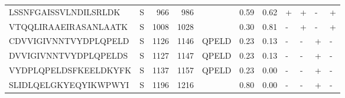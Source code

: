 \begin{tabular}{llrrlrrllll}
LSSNFGAISSVLNDILSRLDK &       S &    966 &   986 &                     &            0.59 &             0.62 &      + &       + &      - &       + \\
VTQQLIRAAEIRASANLAATK &       S &   1008 &  1028 &                     &            0.30 &             0.81 &      - &       + &      - &       + \\
CDVVIGIVNNTVYDPLQPELD &       S &   1126 &  1146 &               QPELD &            0.23 &             0.13 &      - &       - &      + &       - \\
DVVIGIVNNTVYDPLQPELDS &       S &   1127 &  1147 &               QPELD &            0.23 &             0.13 &      - &       - &      + &       - \\
VYDPLQPELDSFKEELDKYFK &       S &   1137 &  1157 &               QPELD &            0.23 &             0.00 &      - &       - &      + &       - \\
SLIDLQELGKYEQYIKWPWYI &       S &   1196 &  1216 &                     &            0.80 &             0.00 &      - &       - &      + &       - \\
\bottomrule
\end{tabular}
